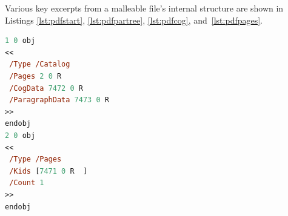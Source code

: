 Various key excerpts from a malleable \pdf{} file's internal structure are shown in Listings \ref{lst:pdfstart}, \ref{lst:pdfpartree}, \ref{lst:pdfcog}, and~\ref{lst:pdfpages}.

\begin{lstlisting}[label=lst:pdfstart,captionpos=b,language=postscript,float,basicstyle=\ttfamily\footnotesize,caption={[Excerpt from a malleable document \textsc{pdf}]An excerpt from the start of a malleable document \pdf{} file. A reference to the \texttt{/ParagraphData} object (shown in Listing~\ref{lst:pdfpartree}) has been added to the \pdf{}'s \texttt{/Catalog} object. The \texttt{/Pages} object is also shown\ed{}note that there is only ever one page in a malleable \pdf{}.}]
%PDF-1.4
1 0 obj
<<
 /Type /Catalog
 /Pages 2 0 R
 /CogData 7472 0 R
 /ParagraphData 7473 0 R
>>
endobj
2 0 obj
<<
 /Type /Pages
 /Kids [7471 0 R  ]
 /Count 1
>>
endobj
\end{lstlisting}


